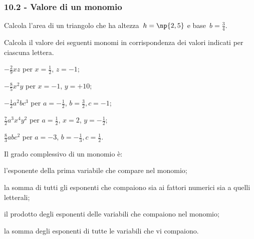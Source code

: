 
\subsubsection*{10.2 - Valore di un monomio}

\begin{esercizio}
\label{ese:10.5} %
Calcola l'area di un triangolo che ha altezza~$h=\np{2,5}$ e base~$b=\frac{3}{4}$.
\end{esercizio}

\begin{esercizio}[\Ast]
	 \label{ese:10.6} %
 Calcola il valore dei seguenti monomi in corrispondenza dei valori indicati per ciascuna lettera.

\begin{multicols}{2}
\begin{enumeratea}
 \item $-\frac{2}{9}xz$ per $ x=\frac{1}{2} $, $z=-1$;
 \item $-\frac{8}{5}x^{2}y$ per $ x=-1 $, $y=+10$;
 \item $-\frac{1}{2}a^{2}bc^3$ per $ a=-\frac{1}{2} $, $b=\frac{3}{2},c=-1$;
 \item $\frac{7}{2}a^{3}x^{4}y^2$ per $ a=\frac{1}{2} $, $x=2$, $y=-\frac{1}{2}$;
 \item $\frac{8}{3}abc^2$ per $ a=-3 $, $b=-\frac{1}{3},c=\frac{1}{2}$.
\end{enumeratea}
\end{multicols}
\end{esercizio}


\begin{esercizio}[\Ast]
 \label{ese:10.7} %
 Il grado complessivo di un monomio è:

\begin{enumeratea}
 \item l'esponente della prima variabile che compare nel monomio;
 \item la somma di tutti gli esponenti che compaiono sia ai fattori
numerici sia a quelli letterali;
 \item il prodotto degli esponenti delle variabili che compaiono nel monomio;
 \item la somma degli esponenti di tutte le variabili che vi compaiono.
\end{enumeratea}
\end{esercizio}


